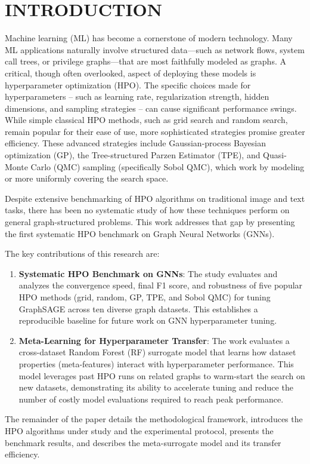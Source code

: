 \section{\uppercase{Introduction}}

Machine learning (ML) has become a cornerstone of modern technology. Many ML applications naturally involve structured data—such as network flows, system call trees, or privilege graphs—that are most faithfully modeled as graphs. A critical, though often overlooked, aspect of deploying these models is hyperparameter optimization (HPO). The specific choices made for hyperparameters -- such as learning rate, regularization strength, hidden dimensions, and sampling strategies -- can cause significant performance swings. While simple classical HPO methods, such as grid search and random search, remain popular for their ease of use, more sophisticated strategies promise greater efficiency. These advanced strategies include Gaussian-process Bayesian optimization (GP), the Tree-structured Parzen Estimator (TPE), and Quasi-Monte Carlo (QMC) sampling (specifically Sobol QMC), which work by modeling or more uniformly covering the search space.

Despite extensive benchmarking of HPO algorithms on traditional image and text tasks, there has been no systematic study of how these techniques perform on general graph-structured problems. This work addresses that gap by presenting the first systematic HPO benchmark on Graph Neural Networks (GNNs).

The key contributions of this research are:
\begin{enumerate}
	\item \textbf{Systematic HPO Benchmark on GNNs}: The study evaluates and analyzes the convergence speed, final F1 score, and robustness of five popular HPO methods (grid, random, GP, TPE, and Sobol QMC) for tuning GraphSAGE across ten diverse graph datasets. This establishes a reproducible baseline for future work on GNN hyperparameter tuning.
	\item \textbf{Meta-Learning for Hyperparameter Transfer}: The work evaluates a cross-dataset Random Forest (RF) surrogate model that learns how dataset properties (meta-features) interact with hyperparameter performance. This model leverages past HPO runs on related graphs to warm-start the search on new datasets, demonstrating its ability to accelerate tuning and reduce the number of costly model evaluations required to reach peak performance.
\end{enumerate}

The remainder of the paper details the methodological framework, introduces the HPO algorithms under study and the experimental protocol, presents the benchmark results, and describes the meta-surrogate model and its transfer efficiency.

